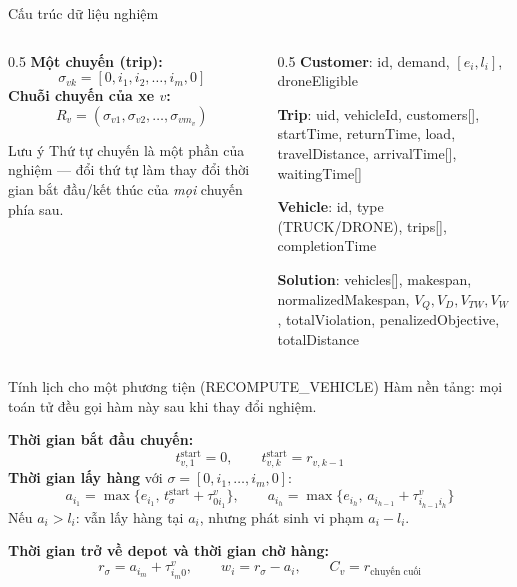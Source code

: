 \documentclass[aspectratio=169]{beamer}
\begin{document}
\begin{frame}{Cấu trúc dữ liệu nghiệm}
  \begin{columns}[T]
    \begin{column}{0.5\textwidth}
      \textbf{Một chuyến (trip):}
      $$\sigma_{vk} = [0, i_1, i_2, \ldots, i_m, 0]$$
      \textbf{Chuỗi chuyến của xe $v$:}
      $$R_v = (\sigma_{v1}, \sigma_{v2}, \ldots, \sigma_{vm_v})$$
      \begin{alertblock}{Lưu ý}
        Thứ tự chuyến là một phần của nghiệm — đổi thứ tự làm thay đổi thời gian bắt đầu/kết thúc của \emph{mọi} chuyến phía sau.
      \end{alertblock}
    \end{column}
    \begin{column}{0.5\textwidth}
      \small
      \textbf{Customer}: id, demand, $[e_i,l_i]$, droneEligible

      \textbf{Trip}: uid, vehicleId, customers[], startTime, returnTime, load, travelDistance, arrivalTime[], waitingTime[]

      \textbf{Vehicle}: id, type (TRUCK/DRONE), trips[], completionTime

      \textbf{Solution}: vehicles[], makespan, normalizedMakespan, $V_Q,V_D,V_{TW},V_W$, totalViolation, penalizedObjective, totalDistance
    \end{column}
  \end{columns}
\end{frame}

\begin{frame}{Tính lịch cho một phương tiện (RECOMPUTE\_VEHICLE)}
  \small Hàm nền tảng: mọi toán tử đều gọi hàm này sau khi thay đổi nghiệm.

  \textbf{Thời gian bắt đầu chuyến:}
  $$t^{\text{start}}_{v,1} = 0, \qquad t^{\text{start}}_{v,k} = r_{v,k-1}$$
  \textbf{Thời gian lấy hàng} với $\sigma = [0, i_1, \ldots, i_m, 0]$:
  $$a_{i_1} = \max\{e_{i_1},\, t^{\text{start}}_\sigma + \tau^v_{0 i_1}\}, \qquad
    a_{i_h} = \max\{e_{i_h},\, a_{i_{h-1}} + \tau^v_{i_{h-1} i_h}\}$$
  Nếu $a_i > l_i$: vẫn lấy hàng tại $a_i$, nhưng phát sinh vi phạm $a_i - l_i$.

  \textbf{Thời gian trở về depot và thời gian chờ hàng:}
  $$r_\sigma = a_{i_m} + \tau^v_{i_m 0}, \qquad w_i = r_\sigma - a_i, \qquad C_v = r_{\text{chuyến cuối}}$$

  \begin{center}
  \end{center}
\end{frame}
\end{document}
